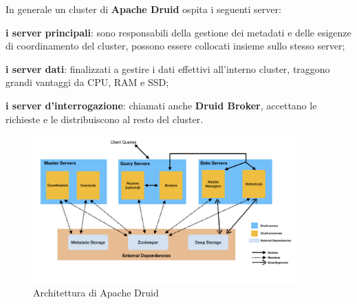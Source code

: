 In generale un \gls{cluster}{} di \textbf{Apache Druid} ospita i seguenti server: 
\begin{list}{*}
    \item \textbf{i server principali}: sono responsabili della gestione dei \gls{metadati}{} e delle esigenze di coordinamento del \gls{cluster}{}, possono essere collocati insieme sullo stesso server;
    \item \item \textbf{i server dati}: finalizzati a  gestire i dati effettivi all'interno \gls{cluster}{}, traggono grandi vantaggi da CPU, RAM e SSD;
    \item  \textbf{i server d'interrogazione}: chiamati anche \textbf{Druid Broker}, accettano le richieste e le distribuiscono al resto del cluster.
\end{list}
\begin{figure}[h]   
    \centering
    \includegraphics[width=0.9\textwidth]{images/componenti/druid_architectcture.png}
    \caption{Architettura di Apache Druid}
    \label{fig:druid_architecture}
\end{figure}
\pagebreak
